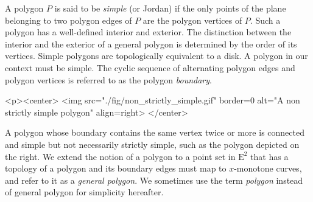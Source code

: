 A polygon $P$ is said to be {\em simple} (or Jordan) if the
only points of the plane belonging to two polygon edges of $P$ are the
polygon vertices of $P$. Such a polygon has a well-defined interior
and exterior. The distinction between the interior and  the exterior of a
general polygon is determined by the order of its vertices. Simple polygons 
are topologically equivalent to a disk. A polygon in our context must be 
simple. The cyclic sequence of alternating polygon edges and polygon vertices 
is referred to as the polygon {\em boundary}. 
\lcTex{%
  \setlength{\widthRight}{1.4cm}
  \setlength{\widthLeft}{\widthLineReal}
  \addtolength{\widthLeft}{-\widthRight}
  \begin{minipage}{\widthLeft}
}
\label{fig:non_strictly_simple_polygon}
\begin{ccHtmlOnly}
  <p><center>
    <img src="./fig/non_strictly_simple.gif" border=0 alt="A non strictly simple polygon" align=right>
  </center>
\end{ccHtmlOnly}
A polygon whose boundary 
contains the same vertex twice or more is connected and simple but not
necessarily strictly simple, such as the polygon depicted on the right. 
We extend the notion of a polygon to a point set in $\mathrm{E}^2$ that has 
a topology of a polygon and its boundary edges must map to $x$-monotone
curves, and refer to it as a {\em general polygon}. We sometimes use
the term {\em polygon} instead of general polygon for simplicity hereafter.


